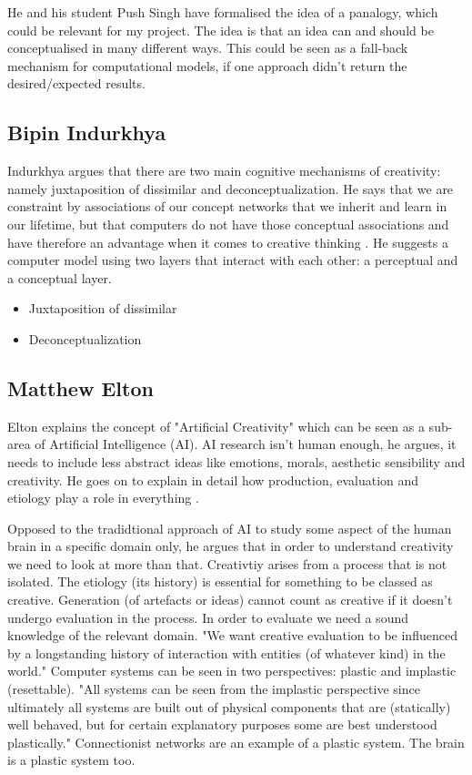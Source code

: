He and his student Push Singh have formalised the idea of a panalogy, which could be relevant for my project. The idea is that an idea can and should be conceptualised in many different ways. This could be seen as a fall-back mechanism for computational models, if one approach didn't return the desired/expected results.

\subsection{Bipin Indurkhya}

Indurkhya argues that there are two main cognitive mechanisms of creativity: namely juxtaposition of dissimilar and deconceptualization. He says that we are constraint by associations of our concept networks that we inherit and learn in our lifetime, but that computers do not have those conceptual associations and have therefore an advantage when it comes to creative thinking \citep{Indurkhya}. He suggests a computer model using two layers that interact with each other: a perceptual and a conceptual layer.

\begin{itemize}
  \item Juxtaposition of dissimilar
  \item Deconceptualization
\end{itemize}

\subsection{Matthew Elton}

Elton explains the concept of "Artificial Creativity" which can be seen as a sub-area of Artificial Intelligence (AI). AI research isn't human enough, he argues, it needs to include less abstract ideas like emotions, morals, aesthetic sensibility and creativity. He goes on to explain in detail how production, evaluation and etiology play a role in everything \citep{Elton1995}.

Opposed to the tradidtional approach of AI to study  some aspect of the human brain in a specific domain only, he argues that in order to understand creativity we need to look at more than that. Creativtiy arises from a process that is not isolated. The etiology (its history) is essential for something to be classed as creative. Generation (of artefacts or ideas) cannot count as creative if it doesn't undergo evaluation in the process. In order to evaluate we need a sound knowledge of the relevant domain. "We want creative evaluation to be influenced by a longstanding history of interaction with entities (of whatever kind) in the world." Computer systems can be seen in two perspectives: plastic and implastic (resettable). "All systems can be seen from the implastic perspective since ultimately all systems are built out of physical components that are (statically) well behaved, but for certain explanatory purposes some are best understood plastically." Connectionist networks are an example of a plastic system. The brain is a plastic system too.

